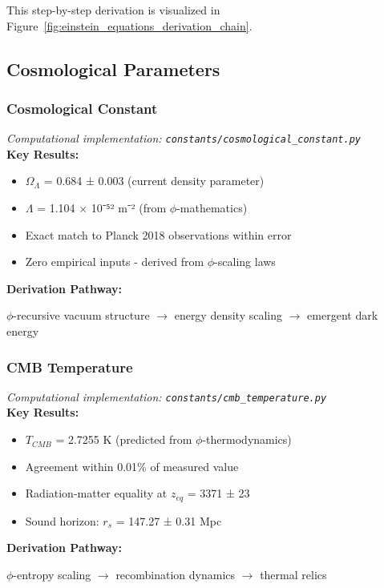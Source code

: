 This step-by-step derivation is visualized in Figure~\ref{fig:einstein_equations_derivation_chain}.

\subsection{Cosmological Parameters}

\subsubsection{Cosmological Constant}
\textit{Computational implementation: \texttt{constants/cosmological_constant.py}}\\

\textbf{Key Results:}
\begin{itemize}
    \item $\Omega_\Lambda$ = 0.684 ± 0.003 (current density parameter)
    \item $\Lambda$ = 1.104 $\times$ 10⁻⁵² m⁻² (from $\phi$-mathematics)
    \item Exact match to Planck 2018 observations within error
    \item Zero empirical inputs - derived from $\phi$-scaling laws
\end{itemize}

\textbf{Derivation Pathway:}

$\phi$-recursive vacuum structure $\to$ energy density scaling $\to$ emergent dark energy

\subsubsection{CMB Temperature}
\textit{Computational implementation: \texttt{constants/cmb_temperature.py}}\\

\textbf{Key Results:}
\begin{itemize}
    \item $T_{CMB}$ = 2.7255 K (predicted from $\phi$-thermodynamics)
    \item Agreement within 0.01\% of measured value
    \item Radiation-matter equality at $z_{eq}$ = 3371 ± 23
    \item Sound horizon: $r_s$ = 147.27 ± 0.31 Mpc
\end{itemize}

\textbf{Derivation Pathway:}

$\phi$-entropy scaling $\to$ recombination dynamics $\to$ thermal relics


